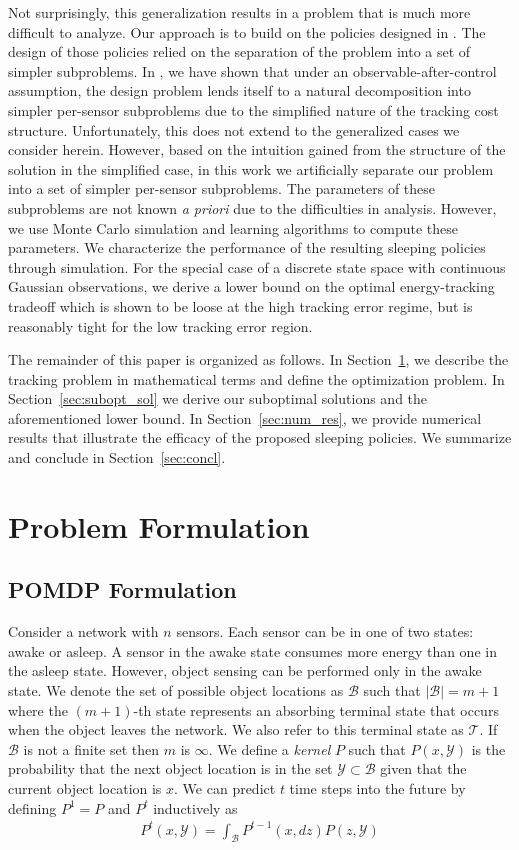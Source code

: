 \documentclass[journal,draftcls,onecolumn,11pt]{IEEEtran}
\newcommand{\term}{\mathcal{T}}
\begin{document}
Not surprisingly, this generalization results in a problem that is much more difficult to analyze. Our approach is to build on the policies designed in \cite{fuemmeler08}. The design of those policies relied on the separation of the problem into a set of simpler subproblems. In \cite{fuemmeler08}, we have shown that under an observable-after-control assumption, the design problem lends itself to a natural decomposition into simpler per-sensor subproblems due to the simplified nature of the tracking cost structure. Unfortunately, this does not extend to the generalized cases we consider herein. However, based on the intuition gained from the structure of the solution in the simplified case, in this work we artificially separate our problem into a set of simpler per-sensor subproblems. The parameters of these subproblems are not known {\em a priori} due to the difficulties in analysis. However, we use Monte Carlo simulation and learning algorithms to compute these parameters. We characterize the performance of the resulting sleeping policies through simulation. For the special case of a discrete state space with continuous Gaussian observations, we derive a lower bound on the optimal energy-tracking tradeoff which is shown to be loose at the high tracking error regime, but is reasonably tight for the low tracking error region.

The remainder of this paper is organized as follows. In Section~\ref{sec:probform}, we describe the tracking problem in mathematical terms and define the optimization problem.  In Section~\ref{sec:subopt_sol} we derive our suboptimal solutions and the aforementioned lower bound. In Section~\ref{sec:num_res}, we provide numerical results that illustrate the efficacy of the proposed sleeping policies. We summarize and conclude in Section~\ref{sec:concl}.


\section{Problem Formulation} \label{sec:probform}
\subsection{POMDP Formulation}
Consider a network with $n$ sensors. Each sensor can be in one of two states: awake or asleep. A sensor in the awake state consumes more energy than one in the asleep state. However, object sensing can be performed only in the awake state.
We denote the set of possible object locations as $\mathcal{B}$ such that $|\mathcal{B}| = m+1$ where the $(m+1)$-th state represents an absorbing terminal state that occurs when the object leaves the network.  We also refer to this terminal state as $\term$.  If $\mathcal{B}$ is not a finite set then $m$ is $\infty$.  We define a {\em kernel} $P$ such that $P(x,\mathcal{Y})$ is the probability that the next object location is in the set $\mathcal{Y} \subset \mathcal{B}$ given that the current object location is $x$.  We can predict $t$ time steps into the future by defining $P^1 = P$ and $P^t$ inductively as
\begin{align}
   P^t(x,\mathcal{Y}) = \int_{\mathcal{B}} P^{t-1}(x,dz) P(z,\mathcal{Y})
\end{align}
\end{document}
